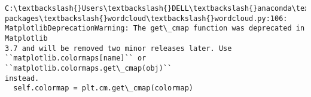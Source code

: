 \documentclass[11pt]{article}
\begin{document}
    \begin{Verbatim}[commandchars=\\\{\}]
C:\textbackslash{}Users\textbackslash{}DELL\textbackslash{}anaconda\textbackslash{}envs\textbackslash{}AIDM\textbackslash{}lib\textbackslash{}site-packages\textbackslash{}wordcloud\textbackslash{}wordcloud.py:106:
MatplotlibDeprecationWarning: The get\_cmap function was deprecated in Matplotlib
3.7 and will be removed two minor releases later. Use
``matplotlib.colormaps[name]`` or ``matplotlib.colormaps.get\_cmap(obj)``
instead.
  self.colormap = plt.cm.get\_cmap(colormap)
    \end{Verbatim}

    \begin{center}
    \end{center}
    { \hspace*{\fill} \\}
    
\end{document}
